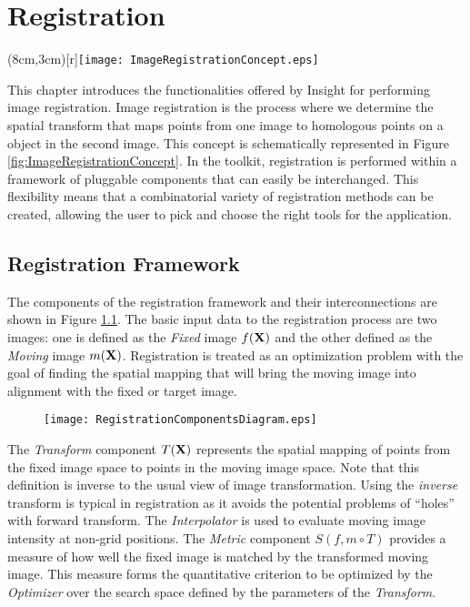 
\chapter{Registration}

\parpic(8cm,3cm)[r]{\texttt{[image: ImageRegistrationConcept.eps]}}
  
This chapter introduces the functionalities offered by Insight for performing
image registration. Image registration is the process where we determine the
spatial transform that maps points from one image to homologous points on a
object in the second image. This concept is schematically represented in Figure
\ref{fig:ImageRegistrationConcept}. In the toolkit, registration is performed
within a framework of pluggable components that can easily be interchanged.
This flexibility means that a combinatorial variety of registration methods can
be created, allowing the user to pick and choose the right tools for the
application.


\section{Registration Framework}
The components of the registration framework and their interconnections 
are shown in Figure \ref{fig:RegistrationComponents}. The basic
input data to the registration process are two images: one
is defined as the \emph{Fixed} image $f(\bf{X})$ and the other defined as the
\emph{Moving} image $m(\bf{X})$. Registration is treated as an optimization problem
with the goal of finding the spatial mapping that will bring the moving image into 
alignment with the fixed or target image.

\begin{figure}
\center
\texttt{[image: RegistrationComponentsDiagram.eps]}
\label{fig:RegistrationComponents}
\end{figure}

The \emph{Transform} component $T(\bf{X})$ represents the spatial mapping of
points from the fixed image space to points in the moving image space. Note
that this definition is inverse to the usual view of image transformation.
Using the \emph{inverse} transform is typical in registration as it avoids the
potential problems of ``holes'' with forward transform. The \emph{Interpolator}
is used to evaluate moving image intensity at non-grid positions. The
\emph{Metric} component $S(f,m \circ T)$ provides a measure of how well the
fixed image is matched by the transformed moving image. This measure forms the
quantitative criterion to be optimized by the \emph{Optimizer} over the search
space defined by the parameters of the \emph{Transform}.

